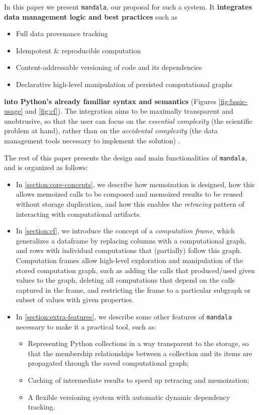 In this paper we present \texttt{mandala}, our proposal for such a system. It \textbf{integrates data management logic and best practices} such as
\begin{itemize}
\item Full data provenance tracking
\item Idempotent \& reproducible computation
\item Content-addressable versioning of code and its dependencies
\item Declarative high-level manipulation of persisted computational graphs
\end{itemize}
\textbf{into Python's already familiar syntax and semantics} (Figures
\ref{fig:basic-usage} and \ref{fig:cf}). The integration aims to be maximally
transparent and unobtrusive, so that the user can focus on the \emph{essential
complexity} (the scientific problem at hand), rather than on the
\emph{accidental complexity} (the data management tools necessary to implement the solution) \citep{Brooks1987NoSB}.

The rest of this paper presents the design and main functionalities of
\texttt{mandala}, and is organized as follows:
\begin{itemize}
\item In \autoref{section:core-concepts}, we describe how memoization is
designed, how this allows memoized calls to be composed and memoized results to
be reused without storage duplication, and how this enables the \emph{retracing}
pattern of interacting with computational artifacts.
\item In \autoref{section:cf}, we introduce the concept of a
\emph{computation frame}, which generalizes a dataframe by replacing columns
with a computational graph, and rows with individual computations that
(partially) follow this graph. Computation frames allow high-level exploration
and manipulation of the stored computation graph, such as adding the calls that
produced/used given values to the graph, deleting all computations that depend
on the calls captured in the frame, and restricting the frame to a particular
subgraph or subset of values with given properties.
\item In \autoref{section:extra-features}, we describe some other features of
\texttt{mandala} necessary to make it a practical tool, such as:
\begin{itemize}
\item Representing Python collections in a way transparent to the storage, so
that the membership relationships between a collection and its items are
propagated through the saved computational graph;
\item Caching of intermediate results to speed up retracing and memoization;
\item A flexible versioning system with automatic dynamic dependency tracking.
\end{itemize}
\end{itemize}

